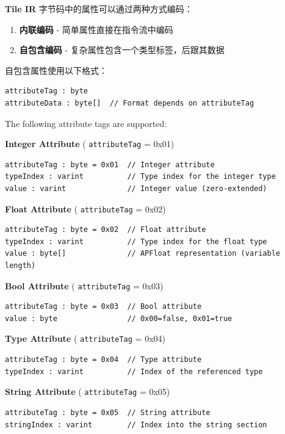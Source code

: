 \documentclass{article}
\begin{document}
\textbf{Tile IR} 字节码中的属性可以通过两种方式编码：


\begin{enumerate}
\item \textbf{内联编码} - 简单属性直接在指令流中编码
\item \textbf{自包含编码} - 复杂属性包含一个类型标签，后跟其数据

\end{enumerate}
自包含属性使用以下格式：


\begin{lstlisting}
attributeTag : byte
attributeData : byte[]  // Format depends on attributeTag
\end{lstlisting}

The following attribute tags are supported:


\textbf{Integer Attribute} ( \texttt{attributeTag} = 0x01)


\begin{lstlisting}
attributeTag : byte = 0x01  // Integer attribute
typeIndex : varint          // Type index for the integer type
value : varint              // Integer value (zero-extended)
\end{lstlisting}

\textbf{Float Attribute} ( \texttt{attributeTag} = 0x02)


\begin{lstlisting}
attributeTag : byte = 0x02  // Float attribute
typeIndex : varint          // Type index for the float type
value : byte[]              // APFloat representation (variable length)
\end{lstlisting}

\textbf{Bool Attribute} ( \texttt{attributeTag} = 0x03)


\begin{lstlisting}
attributeTag : byte = 0x03  // Bool attribute
value : byte                // 0x00=false, 0x01=true
\end{lstlisting}

\textbf{Type Attribute} ( \texttt{attributeTag} = 0x04)


\begin{lstlisting}
attributeTag : byte = 0x04  // Type attribute
typeIndex : varint          // Index of the referenced type
\end{lstlisting}

\textbf{String Attribute} ( \texttt{attributeTag} = 0x05)


\begin{lstlisting}
attributeTag : byte = 0x05  // String attribute
stringIndex : varint        // Index into the string section
\end{lstlisting}
\end{document}
